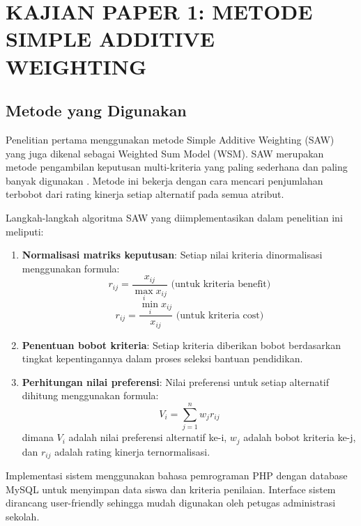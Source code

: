 \documentclass[10pt,a4paper]{article}
\begin{document}
\section{KAJIAN PAPER 1: METODE SIMPLE ADDITIVE WEIGHTING}

\subsection{Metode yang Digunakan}

Penelitian pertama menggunakan metode Simple Additive Weighting (SAW) yang juga dikenal sebagai Weighted Sum Model (WSM). SAW merupakan metode pengambilan keputusan multi-kriteria yang paling sederhana dan paling banyak digunakan \cite{fishburn1967additive}. Metode ini bekerja dengan cara mencari penjumlahan terbobot dari rating kinerja setiap alternatif pada semua atribut.

Langkah-langkah algoritma SAW yang diimplementasikan dalam penelitian ini meliputi:

\begin{enumerate}
    \item \textbf{Normalisasi matriks keputusan}: Setiap nilai kriteria dinormalisasi menggunakan formula:
    \begin{equation}
        r_{ij} = \frac{x_{ij}}{\max_i x_{ij}} \text{ (untuk kriteria benefit)}
    \end{equation}
    \begin{equation}
        r_{ij} = \frac{\min_i x_{ij}}{x_{ij}} \text{ (untuk kriteria cost)}
    \end{equation}
    
    \item \textbf{Penentuan bobot kriteria}: Setiap kriteria diberikan bobot berdasarkan tingkat kepentingannya dalam proses seleksi bantuan pendidikan.
    
    \item \textbf{Perhitungan nilai preferensi}: Nilai preferensi untuk setiap alternatif dihitung menggunakan formula:
    \begin{equation}
        V_i = \sum_{j=1}^{n} w_j r_{ij}
    \end{equation}
    dimana $V_i$ adalah nilai preferensi alternatif ke-i, $w_j$ adalah bobot kriteria ke-j, dan $r_{ij}$ adalah rating kinerja ternormalisasi.
\end{enumerate}

Implementasi sistem menggunakan bahasa pemrograman PHP dengan database MySQL untuk menyimpan data siswa dan kriteria penilaian. Interface sistem dirancang user-friendly sehingga mudah digunakan oleh petugas administrasi sekolah.
\end{document}
